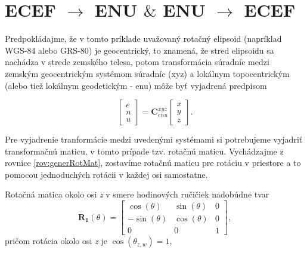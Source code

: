 \section{ECEF $\rightarrow$ ENU $\&$ ENU $\rightarrow$ ECEF}

Predpokládajme, že v tomto príklade uvažovaný rotačný elipsoid (napríklad WGS-84 alebo GRS-80) je geocentrický, to znamená, že stred elipsoidu sa nachádza v strede zemského telesa, potom transformácia súradníc medzi zemským geocentrickým systémom súradníc (xyz) a lokálnym topocentrickým (alebo tiež lokálnym geodetickým - enu) môže byť vyjadrená predpisom \cite{Soler1998}

\begin{equation}
\begin{bmatrix}
e \\
n \\
u
\end{bmatrix} = 
\mathbf{C}_{enu}^{xyz}
\begin{bmatrix}
x \\
y \\
z
\end{bmatrix}.
\label{rov:ecef2enu1}
\end{equation}

Pre vyjadrenie tranformácie medzi uvedenými systémami si potrebujeme vyjadriť transformačnú maticu, v tomto prípade tzv. rotačnú maticu. Vychádzajme z rovnice \ref{rov:generRotMat}, zostavíme rotačnú maticu pre rotáciu v priestore a to pomocou jednoduchých rotácii v každej osi samostatne.

Rotačná matica okolo osi \textit{z} v smere hodinových ručičiek nadobúdne tvar
\begin{equation}
\mathbf{R_{1}}\left(\theta\right) = 
\begin{bmatrix}
\cos{\left(\theta\right)} & \sin{\left(\theta\right)} & 0 \\
-\sin{\left(\theta\right)} & \cos{\left(\theta\right)} & 0 \\
0 & 0 & 1
\end{bmatrix},
\end{equation}
pričom rotácia okolo osi \textit{z} je $\cos{\left(\theta_{z,w}\right)} = 1$,




